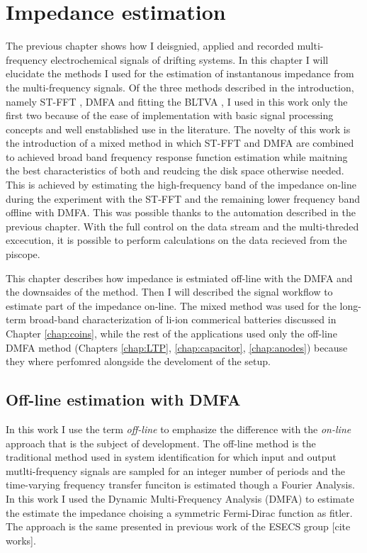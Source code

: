 \chapter{Impedance estimation}
\label{chap:estimation}

The previous chapter shows how I deisgnied, applied and recorded multi-frequency electrochemical signals of drifting systems.
In this chapter I will elucidate the methods I used for the estimation of instantanous impedance from the multi-frequency signals.
Of the three methods described in the introduction, namely ST-FFT \pageref{sec:fft-eis}, DMFA \pageref{sec:dmfa} and fitting the BLTVA \pageref{sec:BLTVA}, I used in this work only the first two because of the ease of implementation with basic signal processing concepts and well enstablished use in the literature.
The novelty of this work is the introduction of a mixed method in which ST-FFT and DMFA are combined to achieved broad band frequency response function estimation while maitning the best characteristics of both and reudcing the disk space otherwise needed.
This is achieved by estimating the high-frequency band of the impedance on-line during the experiment with the ST-FFT and the remaining lower frequency band offline with DMFA.
This was possible thanks to the automation described in the previous chapter.
With the full control on the data stream and the multi-threded excecution, it is possible to perform calculations on the data recieved from the piscope.

This chapter describes how impedance is estmiated off-line with the DMFA and the downsaides of the method. 
Then I will described the signal workflow to estimate part of the impedance on-line.
The mixed method was used for the long-term broad-band characterization of li-ion commerical batteries discussed in Chapter \ref{chap:coins}, while the rest of the applications used only the off-line DMFA method (Chapters \ref{chap:LTP}, \ref{chap:capacitor}, \ref{chap:anodes}) because they where perfomred alongside the develoment of the setup.

\section{Off-line estimation with DMFA}
In this work I use the term \emph{off-line} to emphasize the difference with the \emph{on-line} approach that is the subject of development.
The off-line method is the traditional method used in system identification for which input and output mutlti-frequency signals are sampled for an integer number of periods and the time-varying frequency transfer funciton is estimated though a Fourier Analysis. 
In this work I used the Dynamic Multi-Frequency Analysis (DMFA) to estimate the estimate the impedance choising a symmetric Fermi-Dirac function as fitler.
The approach is the same presented in previous work of the ESECS group [cite works].


